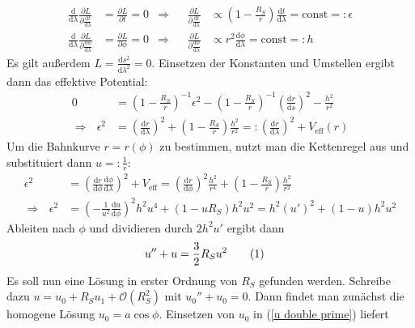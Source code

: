 \documentclass[a4paper,12pt]{article}
\newcommand\numberthis{\addtocounter{equation}{1}\tag{\theequation}}
\newcommand{\kla}{}
\newcommand{\tecxt}{}
\begin{document}
\begin{align*}
\frac{\tecxt\text{d}}{\tecxt\text{d}\lambda}\frac{\partial L}{\partial \frac{\tecxt\text{d}t}{\tecxt\text{d}\lambda}}&=\frac{\partial L}{\partial t}=0&\Rightarrow &&\frac{\partial L}{\partial \frac{\tecxt\text{d}t}{\tecxt\text{d}\lambda}}&\propto \kla\left( {1-\frac{R_S}{r}} \right)\frac{\tecxt\text{d}t}{\tecxt\text{d}\lambda}=\tecxt\text{const}=: \epsilon\\
\frac{\tecxt\text{d}}{\tecxt\text{d}\lambda}\frac{\partial L}{\partial \frac{\tecxt\text{d}\phi}{\tecxt\text{d}\lambda}}&=\frac{\partial L}{\partial \phi}=0&\Rightarrow &&\frac{\partial L}{\partial \frac{\tecxt\text{d}\phi}{\tecxt\text{d}\lambda}}&\propto r^2\frac{\tecxt\text{d}\phi}{\tecxt\text{d}\lambda}=\tecxt\text{const}=:h
\end{align*}
Es gilt außerdem $L=\frac{\tecxt\text{d}s^2}{\tecxt\text{d}\lambda^2}=0$. Einsetzen der Konstanten und Umstellen ergibt dann das effektive Potential:
\begin{align*}
0&=\kla\left( {1-\frac{R_S}{r}} \right)^{-1}\epsilon^2-\kla\left( {1-\frac{R_S}{r}} \right)^{-1}\kla\left( {\frac{\tecxt\text{d}r}{\tecxt\text{d}s}} \right)^2-\frac{h^2}{r^2}\\
\Rightarrow\ \ \ \epsilon^2&=\kla\left( {\frac{\tecxt\text{d}r}{\tecxt\text{d}\lambda}} \right)^2+\kla\left( {1-\frac{R_S}{r}} \right)\frac{h^2}{r^2}=:\kla\left( {\frac{\tecxt\text{d}r}{\tecxt\text{d}\lambda}} \right)^2+V_\tecxt\text{eff}(r)
\end{align*}
Um die Bahnkurve $r=r(\phi)$ zu bestimmen, nutzt man die Kettenregel aus und substituiert dann $u=:\frac{1}{r}$:
\begin{align*}
\epsilon^2&=\kla\left( {\frac{\tecxt\text{d}r}{\tecxt\text{d}\phi}\frac{\tecxt\text{d}\phi}{\tecxt\text{d}\lambda}} \right)^2+V_\tecxt\text{eff}=\kla\left( {\frac{\tecxt\text{d}r}{\tecxt\text{d}\phi}} \right)^2\frac{h^2}{r^4}+\kla\left( {1-\frac{R_S}{r}} \right)\frac{h^2}{r^2}\\
\Rightarrow\ \ \ \epsilon^2&=\kla\left( {-\frac{1}{u^2}\frac{\tecxt\text{d}u}{\tecxt\text{d}\phi}} \right)^2h^2u^4+(1-uR_S)h^2u^2=h^2(u')^2+(1-u)h^2u^2
\end{align*}
Ableiten nach $\phi$ und dividieren durch $2h^2u'$ ergibt dann
\begin{align*}
u''+u&=\frac{3}{2}R_S u^2\numberthis\label{u double prime}
\end{align*}
Es soll nun eine Lösung in erster Ordnung von $R_S$ gefunden werden. Schreibe dazu $u=u_0+R_S u_1+\mathcal{O}(R_S^2)$ mit $u_0''+u_0=0$. Dann findet man zunächst die homogene Lösung $u_0=a\cos \phi$. Einsetzen von $u_0$ in (\ref{u double prime}) liefert
\end{document}
